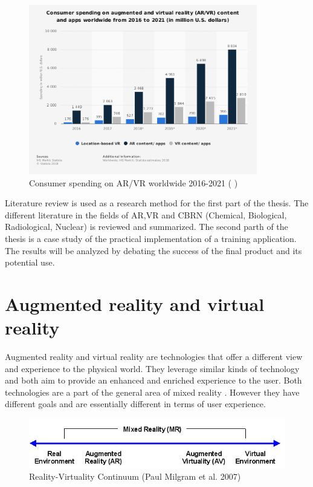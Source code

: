 \documentclass[12pt, a4paper,oneside, nocenter]{thesis}
\newcommand{\citeyeartitlexamkinline}[1]{(\usebibentry{#1}{title} \citeyear{#1})}
\begin{document}
\begin{figure}[H]
	\centering
	\includegraphics[height=210pt]{ar-vr-consumer-spending}
	\caption{Consumer spending on AR/VR worldwide 2016-2021 \citeyeartitlexamkinline{ar-vr-chart}}
	\label{fig:ar-vr-consumer-spending}
\end{figure}
Literature review is used as a research method for the first part of the thesis. The different literature in the fields of AR,VR and CBRN (Chemical, Biological, Radiological, Nuclear) is reviewed and summarized. The second parth of the thesis is a case study of the practical implementation of a training application. The results will be analyzed by debating the success of the final product and its potential use.
\par
\chapter{\texorpdfstring{Augmented reality and virtual reality}{aug-reality}}
Augmented reality and virtual reality are technologies that offer a different view and experience to the physical world. They leverage similar kinds of technology and both aim to provide an enhanced and enriched experience to the user. Both technologies are a part of the general area of mixed reality . However they have different goals and are essentially different in terms of user experience.

\begin{figure}[H]
\includegraphics[width=\textwidth]{Virtuality_Continuum_2}
\caption{Reality-Virtuality Continuum (Paul Milgram et al. 2007)}
\label{fig:reality-virtuality}
\end{figure}
\end{document}
